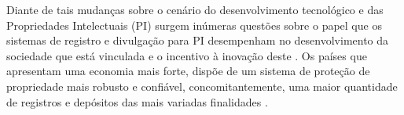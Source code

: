 Diante de tais mudanças sobre o cenário do desenvolvimento tecnológico e das Propriedades Intelectuais (PI) surgem inúmeras questões sobre o papel que os sistemas de registro e divulgação para PI desempenham no desenvolvimento da sociedade que está vinculada e o incentivo à inovação deste \cite{segala_os_2016}. Os países que apresentam uma economia mais forte, dispõe de um sistema de proteção de propriedade mais robusto e confiável, concomitantemente, uma maior quantidade de registros e depósitos das mais variadas finalidades \cite{mueller_universidades_2014}.


